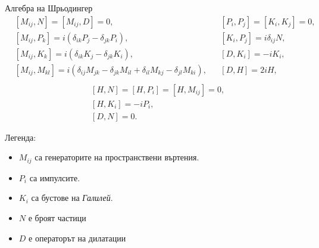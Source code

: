 \documentclass[bulg]{beamer}
\begin{document}
  \begin{frame}{}
  \begin{alertblock}{\small{Алгебра на Шрьодингер}}
  \begin{equation*}
    \begin{aligned}
      &\left[M_{ij},N\right] = \left[M_{ij}, D\right] =0, && \left[P_i,P_j\right] = \left[K_i, K_j\right] = 0, \\
      &\left[M_{ij}, P_k\right] = i(\delta_{ik}P_j - \delta_{jk}P_i), && \left[K_i,P_j\right] = i\delta_{ij}N,\\
      &\left[M_{ij}, K_k\right] = i(\delta_{ik}K_j - \delta_{jk}K_i), && \left[D, K_i\right] = -i K_i,\\
      &\left[M_{ij}, M_{kl}\right] = i(\delta_{ij}M_{jk} - \delta_{jk}M_{il}
      + \delta_{il}M_{kj} -\delta_{jl}M_{ki}), && \left[D, H\right] = 2iH,\\
      \end{aligned}
      \end{equation*}
      \begin{align*}
      &\left[H, N\right] = \left[H,P_i\right] = \left[H, M_{ij}\right]=0,\\
      &\left[H, K_i\right] = -i P_i,\\
      &\left[D, N\right] = 0.
  \end{align*}
  \end{alertblock}
  \tiny{
  Легенда:
  \begin{itemize}
      \item $M_{ij}$ са генераторите на пространствени въртения.
      \item $P_i$ са импулсите.
      \item $K_i$ са бустове на \emph{Галилей}.
      \item $N$ е броят частици
      \item $D$ е операторът на дилатации
  \end{itemize}}
  \end{frame}
\end{document}
